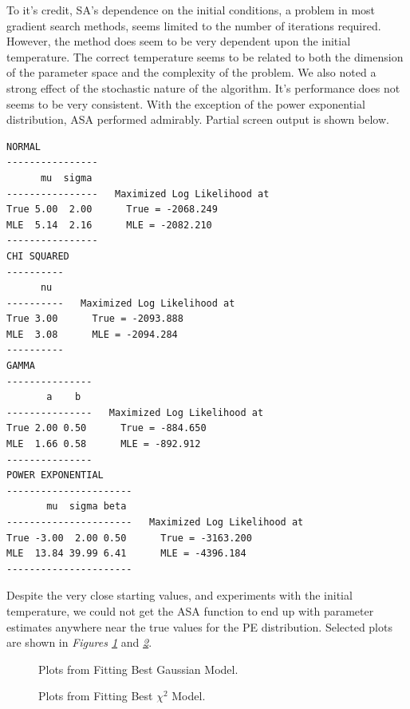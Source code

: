 \documentclass{book}
\begin{document}
To it's credit, SA's dependence on the initial conditions, a
problem in most gradient search methods, seems limited to the
number of iterations required.  However, the method does seem
to be very dependent upon the initial temperature. The correct
temperature seems to be related to both the dimension of the
parameter space and the complexity of the problem. We also
noted a strong effect of the stochastic nature of the
algorithm. It's performance does not seems to be very
consistent. With the exception of the power exponential
distribution, ASA performed admirably. Partial screen output is
shown below.
\begin{verbatim}
NORMAL
----------------
      mu  sigma
----------------   Maximized Log Likelihood at
True 5.00  2.00      True = -2068.249
MLE  5.14  2.16      MLE = -2082.210
----------------
CHI SQUARED
----------
      nu
----------   Maximized Log Likelihood at
True 3.00      True = -2093.888
MLE  3.08      MLE = -2094.284
----------
GAMMA
---------------
       a    b
---------------   Maximized Log Likelihood at
True 2.00 0.50      True = -884.650
MLE  1.66 0.58      MLE = -892.912
---------------
POWER EXPONENTIAL
----------------------
       mu  sigma beta
----------------------   Maximized Log Likelihood at
True -3.00  2.00 0.50      True = -3163.200
MLE  13.84 39.99 6.41      MLE = -4396.184
----------------------
\end{verbatim}
Despite the very close starting values, and experiments with
the initial temperature, we could not get the ASA function to
end up with parameter estimates anywhere near the true values
for the PE distribution. Selected plots are shown in
\emph{Figures \ref{fig_nrmSA}} and \emph{\ref{fig_chiSA}}.
\begin{figure}
\begin{center}
\end{center}
\caption{Plots from Fitting Best Gaussian Model.}
\label{fig_nrmSA}
\end{figure}
\begin{figure}
\begin{center}
\end{center}
\caption{Plots from Fitting Best $\chi^2$ Model.}
\label{fig_chiSA}
\end{figure}
\end{document}
